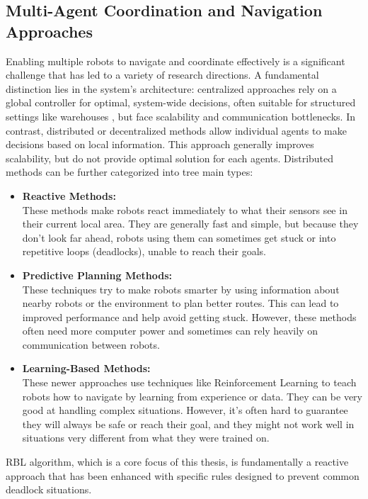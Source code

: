   \subsection{Multi-Agent Coordination and Navigation Approaches}
    Enabling multiple robots to navigate and coordinate effectively is a significant challenge that has led to a variety of research directions.
    A fundamental distinction lies in the system's architecture: centralized approaches rely on a global controller for optimal, system-wide decisions, often suitable for structured settings like warehouses \cite{warehouse_intro}, but face scalability and communication bottlenecks.
    In contrast, distributed or decentralized methods allow individual agents to make decisions based on local information.
    This approach generally improves scalability, but do not provide optimal solution for each agents. 
    Distributed methods can be further categorized into tree main types: 
    \begin{itemize}
      \item \textbf{Reactive Methods: } \\
        These methods make robots react immediately to what their sensors see in their current local area. 
        They are generally fast and simple, but because they don't look far ahead, robots using them can sometimes get stuck or into repetitive loops (deadlocks), unable to reach their goals.
      \item \textbf{Predictive Planning Methods: } \\
        These techniques try to make robots smarter by using information about nearby robots or the environment to plan better routes. 
        This can lead to improved performance and help avoid getting stuck. 
        However, these methods often need more computer power and sometimes can rely heavily on communication between robots.
      \item \textbf{Learning-Based Methods: } \\
        These newer approaches use techniques like Reinforcement Learning to teach robots how to navigate by learning from experience or data. 
        They can be very good at handling complex situations. 
        However, it's often hard to guarantee they will always be safe or reach their goal, and they might not work well in situations very different from what they were trained on.
    \end{itemize}
    \ac{RBL} algorithm, which is a core focus of this thesis, is fundamentally a reactive approach that has been enhanced with specific rules designed to prevent common deadlock situations.


